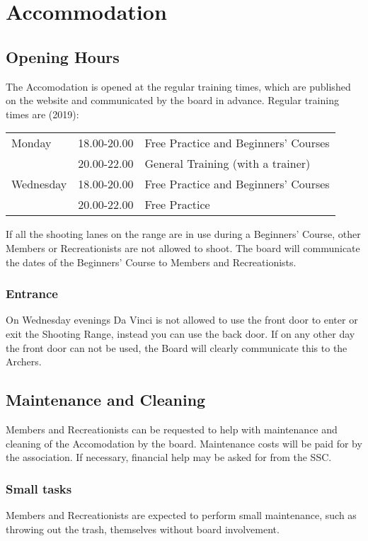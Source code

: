 \documentclass[a4paper]{article}
\begin{document}
\section{Accommodation}
\subsection{Opening Hours}
\label{section:opening}
The Accomodation is opened at the regular training times, which are published on the website and communicated by the board in advance. Regular training times are {\g (2019)}: \\

\begin{tabular}{lll}
Monday    & 18.00-20.00 & Free Practice  and Beginners’ Courses \\
          & 20.00-22.00 & General Training (with a trainer)     \\
Wednesday & 18.00-20.00 & Free Practice and Beginners' Courses  \\
          & 20.00-22.00 & Free Practice                        
\end{tabular}

\bigskip

If all the shooting lanes on the range are in use during a Beginners’ Course, other Members or Recreationists are not allowed to shoot. The board will communicate the dates of the Beginners’ Course to Members and Recreationists.

\subsubsection{Entrance}
On Wednesday evenings Da Vinci is not allowed to use the front door to enter or exit the Shooting Range, instead you can use the back door. If on any other day the front door can not be used, the Board will clearly communicate this to the Archers. 

\subsection{Maintenance and Cleaning}
Members and Recreationists can be requested to help with maintenance and cleaning of the Accomodation by the board. Maintenance costs will be paid for by the association. If necessary, financial help may be asked for from the SSC.

\subsubsection{Small tasks}
Members and Recreationists are expected to perform small maintenance, such as throwing out the trash, themselves without board involvement.
\end{document}
